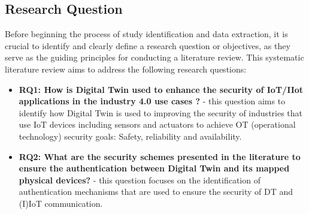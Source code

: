 
\subsection{Research Question}
Before beginning the process of study identification and data extraction, it is crucial to identify and clearly define a research question or objectives, as they serve as the guiding principles for conducting a literature review\cite{carrera-rivera_how-conduct_2022}. This systematic literature review aims to address the following research questions:

\begin{itemize}

    \item \textbf{RQ1: How is Digital Twin used to enhance the security of IoT/IIot applications in the industry 4.0 use cases ?} - 
    this question aims to identify how Digital Twin is used to improving the security of industries that use IoT devices including sensors and actuators to achieve OT (operational technology) security goals: Safety, reliability and availability.

    \item \textbf{RQ2: What are the security schemes presented in the literature to ensure the authentication between Digital Twin and its mapped physical devices?} - 
    this question focuses on the identification of authentication mechanisms that are used to ensure the security of DT and (I)IoT communication.
\end{itemize}